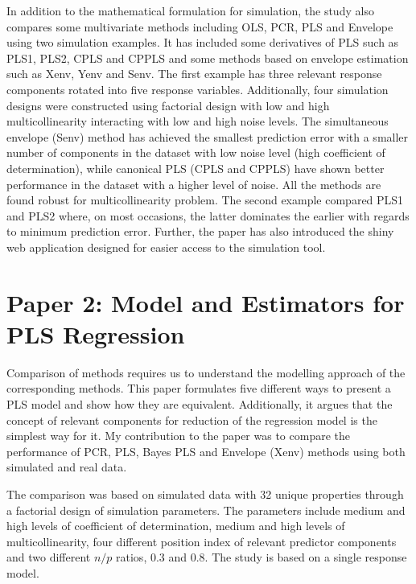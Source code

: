 \documentclass[11pt,twoside,openright,titlepage,
  headinclude,footinclude,BCOR=5mm,
  numbers=noenddot,cleardoublepage=empty,
  tablecaptionabove, dottedtoc,
  bibliography=totoc,paper=a4]{scrreprt}
\begin{document}
In addition to the mathematical formulation for simulation, the study also compares some multivariate methods including OLS, PCR, PLS and Envelope using two simulation examples. It has included some derivatives of PLS such as PLS1, PLS2, CPLS and CPPLS and some methods based on envelope estimation such as Xenv, Yenv and Senv. The first example has three relevant response components rotated into five response variables. Additionally, four simulation designs were constructed using factorial design with low and high multicollinearity interacting with low and high noise levels. The simultaneous envelope (Senv) method has achieved the smallest prediction error with a smaller number of components in the dataset with low noise level (high coefficient of determination), while canonical PLS (CPLS and CPPLS) have shown better performance in the dataset with a higher level of noise. All the methods are found robust for multicollinearity problem. The second example compared PLS1 and PLS2 where, on most occasions, the latter dominates the earlier with regards to minimum prediction error. Further, the paper has also introduced the shiny \citep{shiny} web application designed for easier access to the simulation tool.

\hypertarget{paper-2-model-and-estimators-for-pls-regression}{%
\section{Paper 2: Model and Estimators for PLS Regression}\label{paper-2-model-and-estimators-for-pls-regression}}

Comparison of methods requires us to understand the modelling approach of the corresponding methods. This paper formulates five different ways to present a PLS model \citep{helland1990partial} and show how they are equivalent. Additionally, it argues that the concept of relevant components for reduction of the regression model is the simplest way for it. My contribution to the paper was to compare the performance of PCR, PLS, Bayes PLS and Envelope (Xenv) methods using both simulated and real data.

The comparison was based on simulated data with 32 unique properties through a factorial design of simulation parameters. The parameters include medium and high levels of coefficient of determination, medium and high levels of multicollinearity, four different position index of relevant predictor components and two different \(n/p\) ratios, 0.3 and 0.8. The study is based on a single response model.
\end{document}

